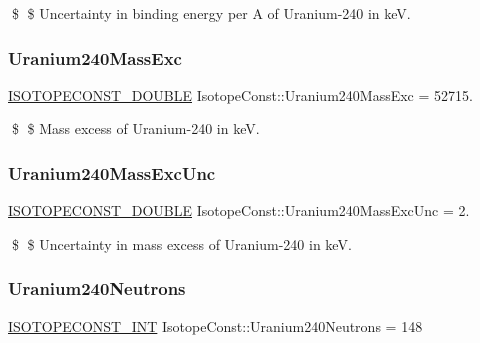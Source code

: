 \$ \$ Uncertainty in binding energy per A of Uranium-\/240 in keV. \mbox{\label{group___isotope_const-_uranium-_u240_gaa490832023f351774d4908e3a666e337}} 
\subsubsection{\texorpdfstring{Uranium240\+Mass\+Exc}{Uranium240MassExc}}
{\footnotesize\ttfamily \mbox{\hyperlink{group___isotope_const-_macros_ga8f45a7272ce02c0b4c65c44636ed719a}{I\+S\+O\+T\+O\+P\+E\+C\+O\+N\+S\+T\+\_\+\+D\+O\+U\+B\+LE}} Isotope\+Const\+::\+Uranium240\+Mass\+Exc = 52715.}

\$ \$ Mass excess of Uranium-\/240 in keV. \mbox{\label{group___isotope_const-_uranium-_u240_ga64d5d0fdd3eaf2da12e455974343e568}} 
\subsubsection{\texorpdfstring{Uranium240\+Mass\+Exc\+Unc}{Uranium240MassExcUnc}}
{\footnotesize\ttfamily \mbox{\hyperlink{group___isotope_const-_macros_ga8f45a7272ce02c0b4c65c44636ed719a}{I\+S\+O\+T\+O\+P\+E\+C\+O\+N\+S\+T\+\_\+\+D\+O\+U\+B\+LE}} Isotope\+Const\+::\+Uranium240\+Mass\+Exc\+Unc = 2.}

\$ \$ Uncertainty in mass excess of Uranium-\/240 in keV. \mbox{\label{group___isotope_const-_uranium-_u240_gaf498a66faff9a0646d9d7b2373b37f6f}} 
\subsubsection{\texorpdfstring{Uranium240\+Neutrons}{Uranium240Neutrons}}
{\footnotesize\ttfamily \mbox{\hyperlink{group___isotope_const-_macros_ga5f18360b3e99483a35c32d789e62621c}{I\+S\+O\+T\+O\+P\+E\+C\+O\+N\+S\+T\+\_\+\+I\+NT}} Isotope\+Const\+::\+Uranium240\+Neutrons = 148}

